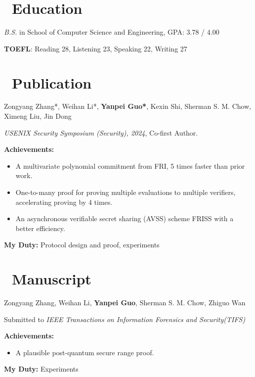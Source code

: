 \documentclass{resume}
\begin{document}



\section{\faGraduationCap\ Education}
\textit{B.S.} in School of Computer Science and Engineering, GPA: 3.78 / 4.00

\textbf{TOEFL}: Reading 28, Listening 23, Speaking 22, Writing 27

\section{\faBook\ Publication}

Zongyang Zhang*, Weihan Li*, \textbf{Yanpei Guo*}, Kexin Shi, Sherman S. M. Chow, Ximeng Liu, Jin Dong

\textit{USENIX Security Symposium (Security), 2024}, Co-first Author.

\textbf{Achievements:}
\begin{itemize}
  \item A multivariate polynomial commitment from FRI, 5 times faster than prior work.
  \item One-to-many proof for proving multiple evaluations to multiple verifiers, accelerating proving by 4 times.
  \item An asynchronous verifiable secret sharing (AVSS) scheme FRISS with a better efficiency. 
\end{itemize}
\textbf{My Duty:} Protocol design and proof, experiments

\section{\faBookmark\ Manuscript}

Zongyang Zhang, Weihan Li, \textbf{Yanpei Guo}, Sherman S. M. Chow, Zhiguo Wan

Submitted to \textit{IEEE Transactions on Information Forensics and Security(TIFS)}

\textbf{Achievements:}
\begin{itemize}
  \item A plausible post-quantum secure range proof.
\end{itemize}
\textbf{My Duty:} Experiments
\end{document}
